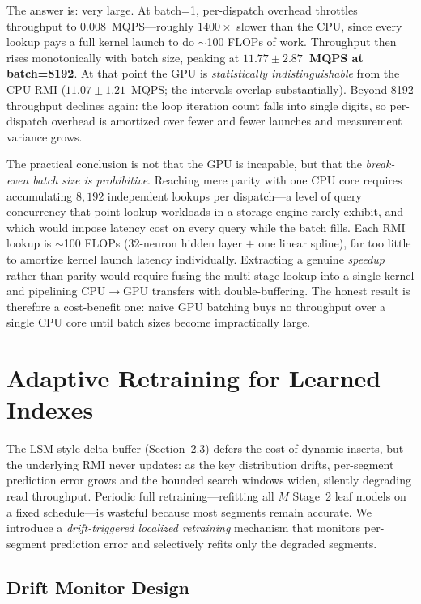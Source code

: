 \documentclass[10pt,twocolumn,a4paper]{article}
\begin{document}
The answer is: very large. At batch=1, per-dispatch overhead throttles throughput to $0.008$~MQPS---roughly $1400\times$ slower than the CPU, since every lookup pays a full kernel launch to do $\sim$100 FLOPs of work. Throughput then rises monotonically with batch size, peaking at \textbf{$11.77 \pm 2.87$~MQPS at batch=8192}. At that point the GPU is \textit{statistically indistinguishable} from the CPU RMI ($11.07 \pm 1.21$~MQPS; the intervals overlap substantially). Beyond 8192 throughput declines again: the loop iteration count falls into single digits, so per-dispatch overhead is amortized over fewer and fewer launches and measurement variance grows.

The practical conclusion is not that the GPU is incapable, but that the \textit{break-even batch size is prohibitive}. Reaching mere parity with one CPU core requires accumulating $8{,}192$ independent lookups per dispatch---a level of query concurrency that point-lookup workloads in a storage engine rarely exhibit, and which would impose latency cost on every query while the batch fills. Each RMI lookup is $\sim$100 FLOPs (32-neuron hidden layer $+$ one linear spline), far too little to amortize kernel launch latency individually. Extracting a genuine \textit{speedup} rather than parity would require fusing the multi-stage lookup into a single kernel and pipelining CPU$\to$GPU transfers with double-buffering. The honest result is therefore a cost-benefit one: naive GPU batching buys no throughput over a single CPU core until batch sizes become impractically large.

\section{Adaptive Retraining for Learned Indexes}

The LSM-style delta buffer (Section~2.3) defers the cost of dynamic inserts, but the underlying RMI never updates: as the key distribution drifts, per-segment prediction error grows and the bounded search windows widen, silently degrading read throughput. Periodic full retraining---refitting all $M$ Stage~2 leaf models on a fixed schedule---is wasteful because most segments remain accurate. We introduce a \textit{drift-triggered localized retraining} mechanism that monitors per-segment prediction error and selectively refits only the degraded segments.

\subsection{Drift Monitor Design}
\end{document}
